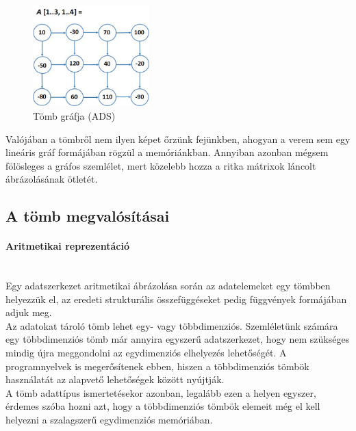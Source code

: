 \documentclass[12pt,margin=0px]{article}
\begin{document}
	\begin{figure}[H]
		\centering
		\includegraphics[width=0.4\textwidth]{img/array_matrix_linked_ads.png}
		\caption{Tömb gráfja (ADS)}
        \label{fig:array_matrix_linked_ads}
	\end{figure}

    \noindent Valójában a tömbről nem ilyen képet őrzünk fejünkben, ahogyan a verem sem egy lineáris gráf formájában rögzül a memóriánkban. Annyiban azonban mégsem fölösleges a gráfos szemlélet, mert közelebb hozza a ritka mátrixok láncolt ábrázolásának ötletét.

    \subsection*{A tömb megvalósításai}

    \paragraph{Aritmetikai reprezentáció\\\\}

    \noindent Egy adatszerkezet aritmetikai ábrázolása során az adatelemeket egy tömbben helyezzük el, az eredeti strukturális összefüggéseket pedig függvények formájában adjuk meg.\\

    \noindent Az adatokat tároló tömb lehet egy- vagy többdimenziós. Szemléletünk számára egy többdimenziós tömb már annyira egyszerű adatszerkezet, hogy nem szükséges mindig újra meggondolni az egydimenziós elhelyezés lehetőségét. A programnyelvek is megerősítenek ebben, hiszen a többdimenziós tömbök használatát az alapvető lehetőségek között nyújtják.\\

    \noindent A tömb adattípus ismertetésekor azonban, legalább ezen a helyen egyszer, érdemes szóba hozni azt, hogy a többdimenziós tömbök elemeit még el kell helyezni a szalagszerű egydimenziós memóriában.\\
\end{document}
